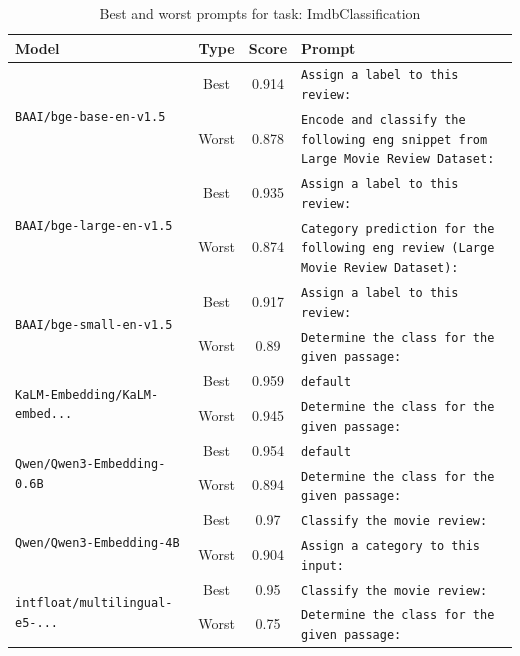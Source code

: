 \begin{table}[t]
\centering
\small
\caption{Best and worst prompts for task: ImdbClassification}
\begin{tabular}{|p{}|c|c|p{}|}
\hline
Model & Type & Score & Prompt \\
\hline
\multirow{2}{=}{\raggedright\texttt{BAAI/\allowbreak bge-\allowbreak base-\allowbreak en-\allowbreak v1.5}} & Best & 0.914 & \texttt{Assign a label to this review:} \\
\cline{2-4}
& Worst & 0.878 & \texttt{Encode and classify the following eng snippet from Large Movie Review Dataset:} \\
\hline
\multirow{2}{=}{\raggedright\texttt{BAAI/\allowbreak bge-\allowbreak large-\allowbreak en-\allowbreak v1.5}} & Best & 0.935 & \texttt{Assign a label to this review:} \\
\cline{2-4}
& Worst & 0.874 & \texttt{Category prediction for the following eng review (Large Movie Review Dataset):} \\
\hline
\multirow{2}{=}{\raggedright\texttt{BAAI/\allowbreak bge-\allowbreak small-\allowbreak en-\allowbreak v1.5}} & Best & 0.917 & \texttt{Assign a label to this review:} \\
\cline{2-4}
& Worst & 0.89 & \texttt{Determine the class for the given passage:} \\
\hline
\multirow{2}{=}{\raggedright\texttt{KaLM-\allowbreak Embedding/\allowbreak KaLM-\allowbreak embed...}} & Best & 0.959 & \texttt{default} \\
\cline{2-4}
& Worst & 0.945 & \texttt{Determine the class for the given passage:} \\
\hline
\multirow{2}{=}{\raggedright\texttt{Qwen/\allowbreak Qwen3-\allowbreak Embedding-\allowbreak 0.6B}} & Best & 0.954 & \texttt{default} \\
\cline{2-4}
& Worst & 0.894 & \texttt{Determine the class for the given passage:} \\
\hline
\multirow{2}{=}{\raggedright\texttt{Qwen/\allowbreak Qwen3-\allowbreak Embedding-\allowbreak 4B}} & Best & 0.97 & \texttt{Classify the movie review:} \\
\cline{2-4}
& Worst & 0.904 & \texttt{Assign a category to this input:} \\
\hline
\multirow{2}{=}{\raggedright\texttt{intfloat/\allowbreak multilingual-\allowbreak e5-\allowbreak ...}} & Best & 0.95 & \texttt{Classify the movie review:} \\
\cline{2-4}
& Worst & 0.75 & \texttt{Determine the class for the given passage:} \\
\hline
\end{tabular}
\end{table}

